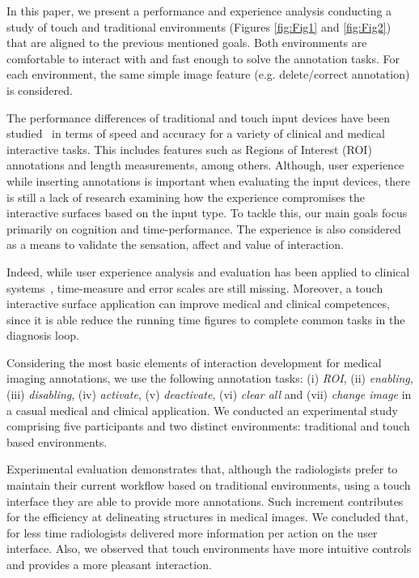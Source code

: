 \documentclass{sigchi}
\begin{document}
In this paper, we present a performance and experience analysis conducting a study of touch and traditional environments (Figures \ref{fig:Fig1} and \ref{fig:Fig2}) that are aligned to the previous mentioned goals. Both environments are  comfortable to interact with and fast enough to solve the annotation tasks. For each environment, the same simple image feature (e.g. delete/correct annotation) is considered.

The performance differences of traditional and touch input devices have been studied~\cite{watson2013deconstructing} in terms of speed and accuracy for a variety of clinical and medical interactive tasks. This includes features such as Regions of Interest (ROI) annotations and length measurements, among others. Although, user experience while inserting annotations is important when evaluating the input devices, there is still a lack of research examining how the experience compromises the interactive surfaces based on the input type. To tackle this, our main goals focus primarily on cognition and time-performance. The experience is also considered as a means to validate the sensation, affect and value of  interaction.

Indeed, while user experience analysis and evaluation has been applied to clinical systems~\cite{crisan2013optimization},  time-measure and error scales are still missing. Moreover, a touch interactive surface application can improve medical and clinical competences, since it is able reduce the running time figures to complete common tasks in the diagnosis loop.

Considering the most basic elements of interaction development for medical imaging annotations, we use the following annotation tasks: (i) \textit{ROI}, (ii) \textit{enabling}, (iii) \textit{disabling}, (iv) \textit{activate}, (v) \textit{deactivate}, (vi) \textit{clear all} and (vii) \textit{change image} in a casual medical and clinical application. We conducted an experimental study comprising five participants and two distinct environments: traditional and touch based environments.

Experimental evaluation demonstrates that, although the radiologists prefer to maintain their current workflow based on traditional environments, using a touch interface they are able to provide more annotations. Such increment contributes for the efficiency at delineating structures in medical images. We concluded that, for less time radiologists delivered more information per action on the user interface. Also, we observed that touch environments have more intuitive controls and provides a more pleasant interaction.
\end{document}
